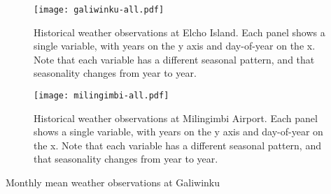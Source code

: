 \begin{figure}[p]
    \centering
    \texttt{[image: galiwinku-all.pdf]}
    \caption[Historical weather observations at Elcho Island]{
        Historical weather observations at Elcho Island.  Each panel shows a single variable, with years on the y axis and day-of-year on the x.
        Note that each variable has a different seasonal pattern, and that seasonality changes from year to year.}
    \label{fig:galiwinku-observations}
\end{figure}
\begin{figure}[p]
    \centering
    \texttt{[image: milingimbi-all.pdf]}
    \caption[Historical weather observations at Milingimbi Airport]{
        Historical weather observations at Milingimbi Airport.  Each panel shows a single variable, with years on the y axis and day-of-year on the x.
        Note that each variable has a different seasonal pattern, and that seasonality changes from year to year.}
    \label{fig:milingimbi-observations}
\end{figure}

\begin{landscape}
\begin{table}
    
    \caption{Monthly mean weather observations at Galiwinku}
    \label{tab:galiwinku-DRAFT-ONLY}
\end{table}
\end{landscape}

